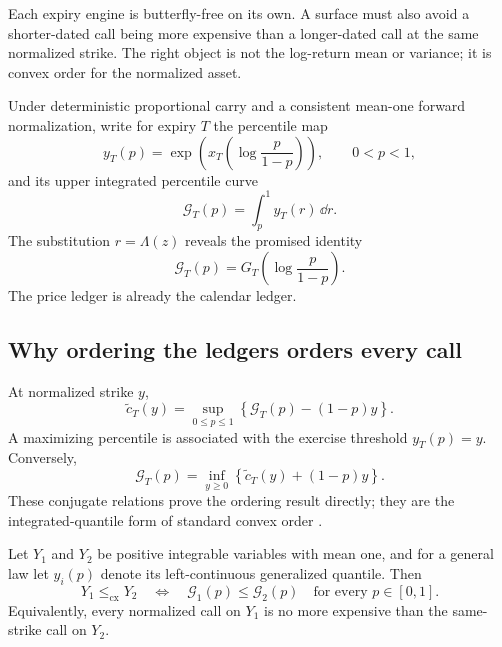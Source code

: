 \documentclass[11pt]{article}
\begin{document}
Each expiry engine is butterfly-free on its own.  A surface must also avoid a
shorter-dated call being more expensive than a longer-dated call at the same
normalized strike.  The right object is not the log-return mean or variance;
it is convex order for the normalized asset.

Under deterministic proportional carry and a consistent mean-one forward
normalization, write for expiry $T$ the percentile map
\begin{equation}
y_T(p)=
\exp\!\left(
x_T\!\left(\log\frac{p}{1-p}\right)
\right),\qquad 0<p<1,
\label{eq:asset_quantile}
\end{equation}
and its upper integrated percentile curve
\begin{equation}
\mathcal G_T(p)=\int_p^1y_T(r)\,\dd r.
\label{eq:integrated_quantile}
\end{equation}
The substitution $r=\Lambda(z)$ reveals the promised identity
\begin{equation}
\mathcal G_T(p)=G_T\!\left(\log\frac{p}{1-p}\right).
\label{eq:G_identity}
\end{equation}
The price ledger is already the calendar ledger.

\subsection{Why ordering the ledgers orders every call}

At normalized strike $y$,
\begin{equation}
\widetilde c_T(y)
=\sup_{0\le p\le1}
\left\{\mathcal G_T(p)-(1-p)y\right\}.
\label{eq:call_conjugate}
\end{equation}
A maximizing percentile is associated with the exercise threshold
$y_T(p)=y$.  Conversely,
\begin{equation}
\mathcal G_T(p)
=\inf_{y\ge0}
\left\{\widetilde c_T(y)+(1-p)y\right\}.
\label{eq:G_conjugate}
\end{equation}
These conjugate relations prove the ordering result directly; they are the
integrated-quantile form of standard convex order
\cite{hardylittlewoodpolya,shakedshanthikumar}.

\begin{theorem}
\label{thm:calendar}
Let $Y_1$ and $Y_2$ be positive integrable variables with mean one, and for a
general law let $y_i(p)$ denote its left-continuous generalized quantile.
Then
\begin{equation}
Y_1\le_{\mathrm{cx}}Y_2
\quad\Longleftrightarrow\quad
\mathcal G_1(p)\le\mathcal G_2(p)
\quad\text{for every }p\in[0,1].
\label{eq:convex_order}
\end{equation}
Equivalently, every normalized call on $Y_1$ is no more expensive than the
same-strike call on $Y_2$.
\end{theorem}
\end{document}
